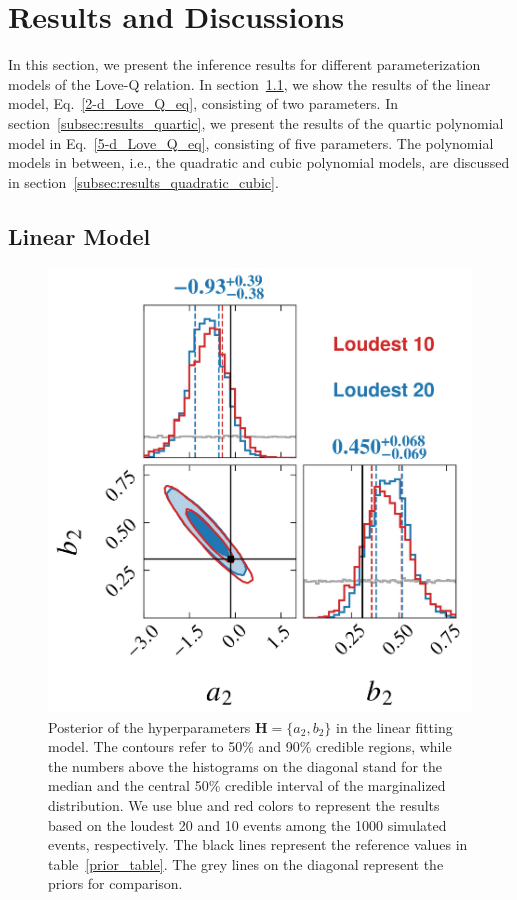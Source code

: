\documentclass[a4paper,11pt]{article}
\newcommand{\ZW}[1]{\textcolor{magenta}{$\mathcal{ZW}$:~#1}}
\begin{document}
\section{Results and Discussions}
\label{sec:results}
In this section, we present the inference results for different parameterization 
models of the Love-Q relation. In section~\ref{subsec:results_linear_model}, we 
show the results of the linear model, Eq.~\eqref{2-d_Love_Q_eq}, consisting of two parameters.
In section~\ref{subsec:results_quartic}, we present the results of the quartic 
polynomial model in Eq.~\eqref{5-d_Love_Q_eq}, consisting of five parameters. The 
polynomial models in between, i.e., the quadratic and cubic polynomial models, are 
discussed in section~\ref{subsec:results_quadratic_cubic}.
\subsection{Linear Model}
\label{subsec:results_linear_model}
\begin{figure}[t]
    \centering
    \includegraphics[width=0.5\linewidth]{comparison_corner_plot.pdf}
    \caption{Posterior of the hyperparameters ${\bm H} = \{a_2,b_2\}$
     in the linear fitting model. The contours refer to 50\% and 90\% credible
     regions, while the numbers above the histograms on the diagonal stand 
    for the median and the central 50\% credible interval of the marginalized
     distribution. We use blue and red colors to represent the results based on
     the loudest 20 and 10 events among the 1000
    simulated events, respectively.
     The black lines represent the reference values in table~\ref{prior_table}.
     The grey lines on the diagonal represent the priors for comparison.}
    \label{corner2-d}
\end{figure}
\end{document}

